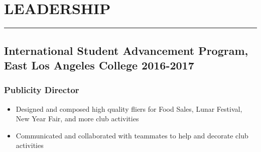 \documentclass[12pt]{article}
\newcommand{\divider}{\vskip2pt\hrule\vskip2pt}
\begin{document}
	\section*{LEADERSHIP}
	\divider
	\subsection*{International Student Advancement Program{\normalfont, East Los Angeles College \hfill 2016-2017}}
	\subsubsection*{Publicity Director}
	\begin{itemize}
		\setlength\itemsep{-1pt}
		\item Designed and composed high quality fliers for Food Sales, Lunar Festival, New Year Fair, and more club activities
		\item Communicated and collaborated with teammates to help and decorate club activities
	\end{itemize}
	
	
\end{document}
